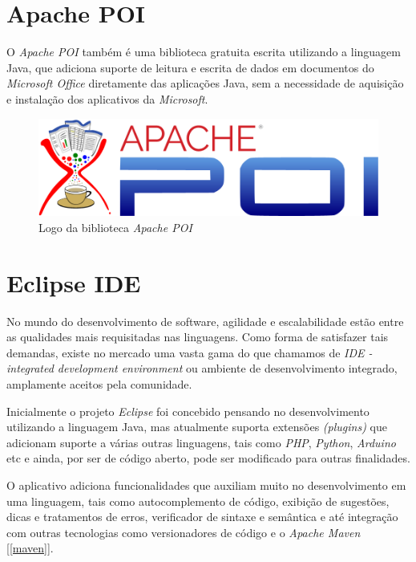 \documentclass[
	12pt,			%
	openright,		%
	oneside,	
	a4paper,		%
	english,		%
	brazil			%
]{abntex2/abntex2}  %
\begin{document}
		\section{Apache POI}
		
			O \textit{Apache POI} \cite{poi} também é uma biblioteca gratuita escrita utilizando a linguagem Java, que adiciona suporte de leitura e escrita de dados em documentos do \textit{Microsoft Office} diretamente das aplicações Java, sem a necessidade de aquisição e instalação dos aplicativos da \textit{Microsoft}.
			
			\begin{figure}[ht]
				\begin{center}
					
					\caption{Logo da biblioteca \textit{Apache POI}}
					\includegraphics[scale=0.3]{img/apache-poi}
					
				\end{center}
			\end{figure}
		
		\section{Eclipse IDE}
		
			No mundo do desenvolvimento de software, agilidade e escalabilidade estão entre as qualidades mais requisitadas nas linguagens. Como forma de satisfazer tais demandas, existe no mercado uma vasta gama do que chamamos de \textit{IDE - integrated development environment} ou ambiente de desenvolvimento integrado, amplamente aceitos pela comunidade.
			
			Inicialmente o projeto \textit{Eclipse} \cite{eclipse} foi concebido pensando no desenvolvimento utilizando a linguagem Java, mas atualmente suporta extensões \textit{(plugins)} que adicionam suporte a várias outras linguagens, tais como \textit{PHP}, \textit{Python}, \textit{Arduino} etc e ainda, por ser de código aberto, pode ser modificado para outras finalidades.
			
			O aplicativo adiciona funcionalidades que auxiliam muito no desenvolvimento em uma linguagem, tais como autocomplemento de código, exibição de sugestões, dicas e tratamentos de erros, verificador de sintaxe e semântica e até integração com outras tecnologias como versionadores de código e o \textit{Apache Maven} [\ref{maven}].
			
\end{document}
